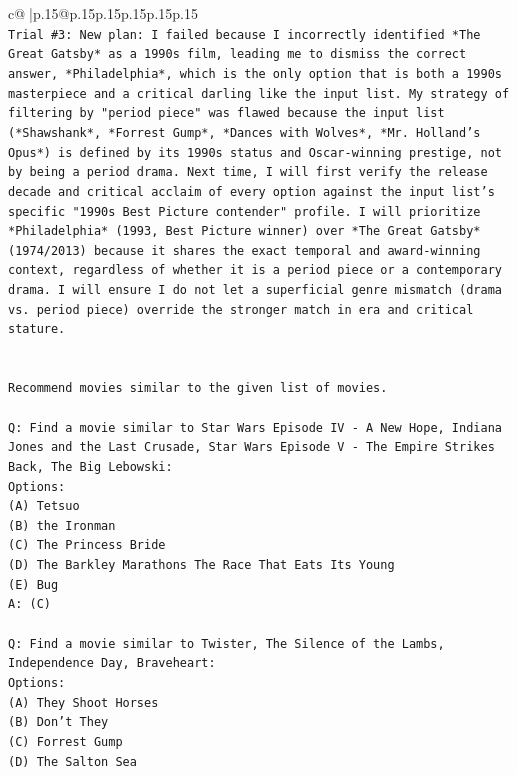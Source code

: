 \documentclass{article}
\begin{document}
{\begin{supertabular}{c@{$\;$}|p{.15\linewidth}@{}p{.15\linewidth}p{.15\linewidth}p{.15\linewidth}p{.15\linewidth}p{.15\linewidth}}
{{{\\ 
\texttt{Trial \#3: New plan: I failed because I incorrectly identified *The Great Gatsby* as a 1990s film, leading me to dismiss the correct answer, *Philadelphia*, which is the only option that is both a 1990s masterpiece and a critical darling like the input list. My strategy of filtering by "period piece" was flawed because the input list (*Shawshank*, *Forrest Gump*, *Dances with Wolves*, *Mr. Holland's Opus*) is defined by its 1990s status and Oscar{-}winning prestige, not by being a period drama. Next time, I will first verify the release decade and critical acclaim of every option against the input list's specific "1990s Best Picture contender" profile. I will prioritize *Philadelphia* (1993, Best Picture winner) over *The Great Gatsby* (1974/2013) because it shares the exact temporal and award{-}winning context, regardless of whether it is a period piece or a contemporary drama. I will ensure I do not let a superficial genre mismatch (drama vs. period piece) override the stronger match in era and critical stature.} \\
\\ 
\\ 
\texttt{Recommend movies similar to the given list of movies.} \\
\\ 
\texttt{Q: Find a movie similar to Star Wars Episode IV {-} A New Hope, Indiana Jones and the Last Crusade, Star Wars Episode V {-} The Empire Strikes Back, The Big Lebowski:} \\
\texttt{Options:} \\
\texttt{(A) Tetsuo} \\
\texttt{(B) the Ironman} \\
\texttt{(C) The Princess Bride} \\
\texttt{(D) The Barkley Marathons The Race That Eats Its Young} \\
\texttt{(E) Bug} \\
\texttt{A: (C)} \\
\\ 
\texttt{Q: Find a movie similar to Twister, The Silence of the Lambs, Independence Day, Braveheart:} \\
\texttt{Options:} \\
\texttt{(A) They Shoot Horses} \\
\texttt{(B) Don't They} \\
\texttt{(C) Forrest Gump} \\
\texttt{(D) The Salton Sea} \\
}}}
\end{supertabular}}
\end{document}
